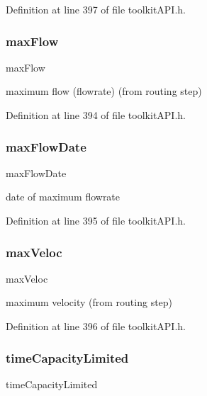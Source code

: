 Definition at line 397 of file toolkit\+A\+P\+I.\+h.

\mbox{\label{struct_s_m___link_stats_a4d84bca5454f3903c44fe865e44674f5}} 
\subsubsection{\texorpdfstring{maxFlow}{maxFlow}}
{\footnotesize\ttfamily max\+Flow}

maximum flow (flowrate) (from routing step) 

Definition at line 394 of file toolkit\+A\+P\+I.\+h.

\mbox{\label{struct_s_m___link_stats_a315e22b4b57846183e5c42beb0271461}} 
\subsubsection{\texorpdfstring{maxFlowDate}{maxFlowDate}}
{\footnotesize\ttfamily max\+Flow\+Date}

date of maximum flowrate 

Definition at line 395 of file toolkit\+A\+P\+I.\+h.

\mbox{\label{struct_s_m___link_stats_ad51aaaeab0403dcc9204d6fc10a150ba}} 
\subsubsection{\texorpdfstring{maxVeloc}{maxVeloc}}
{\footnotesize\ttfamily max\+Veloc}

maximum velocity (from routing step) 

Definition at line 396 of file toolkit\+A\+P\+I.\+h.

\mbox{\label{struct_s_m___link_stats_a368150c8c95f54e720cac8061d7965b0}} 
\subsubsection{\texorpdfstring{timeCapacityLimited}{timeCapacityLimited}}
{\footnotesize\ttfamily time\+Capacity\+Limited}

